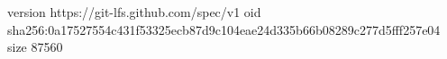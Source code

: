 version https://git-lfs.github.com/spec/v1
oid sha256:0a17527554c431f53325ecb87d9c104eae24d335b66b08289c277d5fff257e04
size 87560
